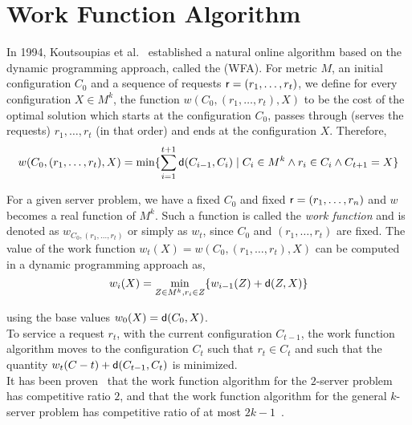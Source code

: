 \section{Work Function Algorithm}\label{sec:work-function-algorithm}

In 1994, Koutsoupias et al.~\cite{KP94} established a natural online algorithm based on the dynamic programming approach, called the  (WFA). For metric $M$, an initial configuration $C_0$ and a sequence of requests $\sf{r}=(r_1,\hdots,r_t)$, we define for every configuration $X\in M^k$, the function $w(C_0, (r_1,\hdots,r_t),X)$ to be the cost of the optimal solution which starts at the configuration $C_0$, passes through (serves the requests) $r_1,\hdots,r_t$ (in that order) and ends at the configuration $X$. Therefore,
$$w(C_0, (r_1,\hdots,r_t),X) = \min\{\sum_{i=1}^{t+1} \sf{d}(C_{i-1},C_i) 
\mid C_i\in M^k \wedge
r_i \in C_i \wedge 
C_{t+1}=X\}$$

For a given server problem, we have a fixed $C_0$ and fixed $\sf{r}=(r_1,\hdots,r_n)$ and $w$ becomes a real function of $M^k$. Such a function is called the \emph{work function} and is denoted as $w_{C_0, (r_1,\hdots,r_t)}$ or simply as $w_t$, since $C_0$ and $(r_1,\hdots,r_t)$ are fixed. The value of the work function $w_t(X)= w(C_0, (r_1,\hdots,r_t),X)$ can be computed in a dynamic programming approach as,
$$w_i(X) = \min_{Z\in M^k, r_i\in Z} \{w_{i-1}(Z) + \sf{d}(Z,X)\}$$

using the base values $w_0(X) = \sf{d}(C_0,X)$. \\

To service a request $r_t$, with the current configuration $C_{t-1}$, the work function algorithm moves to the configuration $C_t$ such that $r_t\in C_t$ and such that the quantity $w_t(C-t) + \sf{d}(C_{t-1},C_t)$ is minimized. \\

It has been proven~\cite{KP94, Kou09} that the work function algorithm for the $2$-server problem has competitive ratio $2$, and that the work function algorithm for the general $k$-server problem has competitive ratio of at most $2k-1$~\cite{Kou09}.

